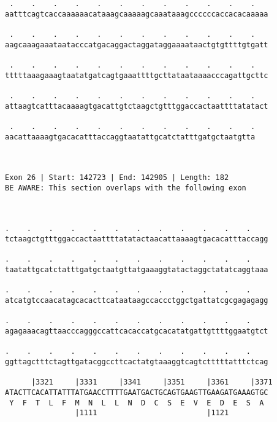 \documentclass{article}
\begin{document}
\begin{Verbatim}
 .    .    .    .    .    .    .    .    .    .    .    .   
aatttcagtcaccaaaaaacataaagcaaaaagcaaataaagccccccaccacacaaaaa
                                                            
 .    .    .    .    .    .    .    .    .    .    .    .   
aagcaaagaaataatacccatgacaggactaggataggaaaataactgtgttttgtgatt
                                                            
 .    .    .    .    .    .    .    .    .    .    .    .   
tttttaaagaaagtaatatgatcagtgaaattttgcttataataaaacccagattgcttc
                                                            
 .    .    .    .    .    .    .    .    .    .    .    .   
attaagtcatttacaaaagtgacattgtctaagctgtttggaccactaattttatatact
                                                            
 .    .    .    .    .    .    .    .    .    .    .    .
aacattaaaagtgacacatttaccaggtaatattgcatctatttgatgctaatgtta
                                                         
                                                         
 
Exon 26 | Start: 142723 | End: 142905 | Length: 182
BE AWARE: This section overlaps with the following exon



.    .    .    .    .    .    .    .    .    .    .    .    
tctaagctgtttggaccactaattttatatactaacattaaaagtgacacatttaccagg
                                                            
.    .    .    .    .    .    .    .    .    .    .    .    
taatattgcatctatttgatgctaatgttatgaaaggtatactaggctatatcaggtaaa
                                                            
.    .    .    .    .    .    .    .    .    .    .    .    
atcatgtccaacatagcacacttcataataagccaccctggctgattatcgcgagagagg
                                                            
.    .    .    .    .    .    .    .    .    .    .    .    
agagaaacagttaacccagggccattcacaccatgcacatatgattgttttggaatgtct
                                                            
.    .    .    .    .    .    .    .    .    .    .    .    
ggttagctttctagttgatacggccttcactatgtaaaggtcagtctttttatttctcag
                                                            
      |3321     |3331     |3341     |3351     |3361     |3371
ATACTTCACATTATTTATGAACCTTTTGAATGACTGCAGTGAAGTTGAAGATGAAAGTGC
 Y  F  T  L  F  M  N  L  L  N  D  C  S  E  V  E  D  E  S  A 
                |1111                         |1121         
  

\end{Verbatim}
\end{document}
